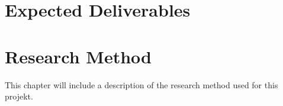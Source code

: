 \section{Expected Deliverables}

\section{Research Method}
 
    This chapter will include a description of the research method used for this projekt.




